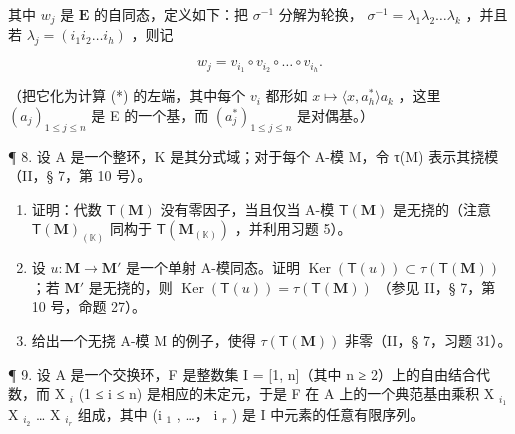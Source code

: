 其中 \(w_{j}\) 是 \(\mathbf{E}\) 的自同态，定义如下：把 \(\sigma^{-1}\) 分解为轮换， \(\sigma^{-1} = \lambda_1\lambda_2\ldots \lambda_k\) ，并且若 \(\lambda_{j} = (i_{1}i_{2}\dots i_{h})\) ，则记

\[
w _ {j} = v _ {i _ {1}} \circ v _ {i _ {2}} \circ \dots \circ v _ {i _ {h}}.
\]

（把它化为计算 (*) 的左端，其中每个 \(v_{i}\) 都形如 \(x \mapsto \langle x, a_{h}^{*} \rangle a_{k}\) ，这里 \((a_{j})_{1 \leqslant j \leqslant n}\) 是 E 的一个基，而 \((a_{j}^{*})_{1 \leqslant j \leqslant n}\) 是对偶基。）

¶ 8. 设 A 是一个整环，K 是其分式域；对于每个 A-模 M，令 τ(M) 表示其挠模（II，§ 7，第 10 号）。

\begin{enumerate}
\def\labelenumi{(\alph{enumi})}
\item
  证明：代数 \(\mathsf{T}(\mathbf{M})\) 没有零因子，当且仅当 A-模 \(\mathsf{T}(\mathbf{M})\) 是无挠的（注意 \(\mathsf{T}(\mathbf{M})_{(\mathbb{K})}\) 同构于 \(\mathsf{T}(\mathbf{M}_{(\mathbb{K})})\) ，并利用习题 5）。
\item
  设 \(u: \mathbf{M} \to \mathbf{M}'\) 是一个单射 A-模同态。证明 \(\operatorname{Ker}(\mathsf{T}(u)) \subset \tau(\mathsf{T}(\mathbf{M}))\) ；若 \(\mathbf{M}'\) 是无挠的，则 \(\operatorname{Ker}(\mathsf{T}(u)) = \tau(\mathsf{T}(\mathbf{M}))\) （参见 II，§ 7，第 10 号，命题 27）。
\item
  给出一个无挠 A-模 M 的例子，使得 \(\tau(\mathsf{T}(\mathbf{M}))\) 非零（II，§ 7，习题 31）。
\end{enumerate}

¶ 9. 设 A 是一个交换环，F 是整数集 I = {[}1, n{]}（其中 n ≥ 2）上的自由结合代数，而 X \(_{i}\) (1 ≤ i ≤ n) 是相应的未定元，于是 F 在 A 上的一个典范基由乘积 X \(_{i_1}\) X \(_{i_2}\) \ldots{} X \(_{i_r}\) 组成，其中 (i \(_{1}\) , \ldots， i \(_{r}\) ) 是 I 中元素的任意有限序列。

